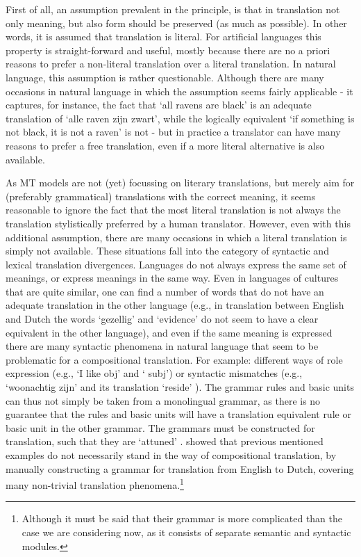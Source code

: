 \documentclass{report}
\begin{document}
First of all, an assumption prevalent in the principle, is that in translation not only meaning, but also form should be preserved (as much as possible). In other words, it is assumed that translation is literal. For artificial languages this property is straight-forward and useful, mostly because there are no a priori reasons to prefer a non-literal translation over a literal translation. In natural language, this assumption is rather questionable. Although there are many occasions in natural language in which the assumption seems fairly applicable - it captures, for instance, the fact that `all ravens are black' is an adequate translation of `alle raven zijn zwart', while the logically equivalent `if something is not black, it is not a raven' is not \citep{landsbergen1989power} - but in practice a translator can have many reasons to prefer a free translation, even if a more literal alternative is also available. 

As MT models are not (yet) focussing on literary translations, but merely aim for (preferably grammatical) translations with the correct meaning, it seems reasonable to ignore the fact that the most literal translation is not always the translation stylistically preferred by a human translator. However, even with this additional assumption, there are many occasions in which a literal translation is simply not available. These situations fall into the category of  syntactic and lexical translation divergences. Languages do not always express the same set of meanings, or express meanings in the same way. Even in languages of cultures that are quite similar, one can find a number of words that do not have an adequate translation in the other language (e.g., in translation between English and Dutch the words `gezellig' and `evidence' do not seem to have a clear equivalent in the other language), and even if the same meaning is expressed there are many syntactic phenomena in natural language that seem to be problematic for a compositional translation. For example: different ways of role expression (e.g., `I like obj' and ` subj') or syntactic mismatches (e.g., `woonachtig zijn' and its translation `reside' \citep{landsbergen1989power}). The grammar rules and basic units can thus not simply be taken from a monolingual grammar, as there is no guarantee that the rules and basic units will have a translation equivalent rule or basic unit in the other grammar. The grammars must be constructed for translation, such that they are `attuned' \citep{rosetta1994compositional}. \cite{rosetta1994compositional} showed that previous mentioned examples do not necessarily stand in the way of compositional translation, by manually constructing a grammar for translation from English to Dutch, covering many non-trivial translation phenomena.\footnote{Although it must be said that their grammar is more complicated than the case we are considering now, as it consists of separate semantic and syntactic modules.}
 
\end{document}
